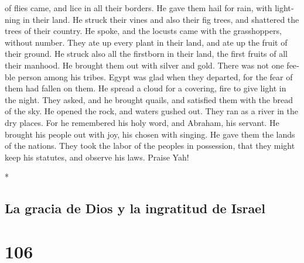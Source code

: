 \begin{paracol}{2}
\begin{otherlanguage}{english}
of flies came, and lice in all their borders.  He gave
them hail for rain, with lightning in their land.  He
struck their vines and also their fig trees, and shattered the trees of
their country.  He spoke, and the locusts came with the
grasshoppers, without number.  They ate up every plant in
their land, and ate up the fruit of their ground.  He
struck also all the firstborn in their land, the first fruits of all
their manhood.  He brought them out with silver and gold.
There was not one feeble person among his tribes.  Egypt
was glad when they departed, for the fear of them had fallen on them.
 He spread a cloud for a covering, fire to give light in
the night.  They asked, and he brought quails, and
satisfied them with the bread of the sky.  He opened the
rock, and waters gushed out. They ran as a river in the dry places.
 For he remembered his holy word, and Abraham, his
servant.  He brought his people out with joy, his chosen
with singing.  He gave them the lands of the nations.
They took the labor of the peoples in possession,  that
they might keep his statutes, and observe his laws. Praise Yah!

\end{otherlanguage}

\switchcolumn[0]*

\hypertarget{la-gracia-de-dios-y-la-ingratitud-de-israel}{%
\subsection{La gracia de Dios y la ingratitud de
Israel}\label{la-gracia-de-dios-y-la-ingratitud-de-israel}}

\hypertarget{section-210}{%
\section{106}\label{section-210}}


\end{paracol}

